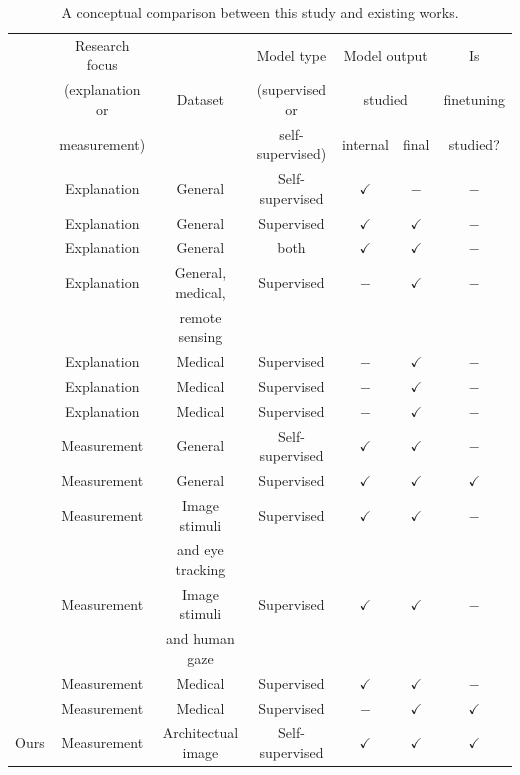 \documentclass[lineno,pdflatex,sn-mathphys-num]{sn-jnl}%
\theoremstyle{thmstyleone}%
\theoremstyle{thmstyletwo}%
\theoremstyle{thmstylethree}%
\begin{document}
\begin{table}[!h]
\caption{A conceptual comparison between this study and existing works. \label{table review}}
\begin{tabular}{ccccccc}
\hline
 & Research focus  &  & Model type & \multicolumn{2}{c}{Model output}  & Is \\
 & (explanation or & Dataset & (supervised or & \multicolumn{2}{c}{ studied}  & finetuning \\
 &  measurement) &  & self-supervised) & internal & final &  studied? \\ \hline\hline
\cite{Kang20259339} & Explanation & General & Self-supervised & $\checkmark$ & $-$ & $-$ \\
\cite{Jo2025582} & Explanation & General & Supervised & $\checkmark$ & $\checkmark$ & $-$ \\
\cite{Liao2025PR} & Explanation & General & both & $\checkmark$ & $\checkmark$ & $-$ \\
\cite{Hanna25ICCV} & Explanation & General, medical, & Supervised & $-$ & $\checkmark$ & $-$ \\
 &  & remote sensing &   &  &  & \\
\cite{Cascone25ICCV} & Explanation & Medical & Supervised & $-$ & $\checkmark$ & $-$ \\
\cite{Hasannezhad2025} & Explanation & Medical & Supervised & $-$ & $\checkmark$ & $-$ \\
\cite{Velvizhi2026} & Explanation & Medical & Supervised & $-$ & $\checkmark$ & $-$ \\ \hline
\cite{park2023what} & Measurement & General & Self-supervised & $\checkmark$ & $\checkmark$ & $-$ \\
\cite{Walmer23CVPR} & Measurement & General & Supervised & $\checkmark$ & $\checkmark$ & $\checkmark$ \\
\cite{Carrasco2026} & Measurement & Image stimuli & Supervised & $\checkmark$ & $\checkmark$ & $-$ \\
 &  & and eye tracking &   &  &  & \\
\cite{Yamamoto2025} & Measurement & Image stimuli & Supervised & $\checkmark$ & $\checkmark$ & $-$ \\
 &  & and human gaze &   &  &  & \\
\cite{Cascone2026947} & Measurement & Medical & Supervised & $\checkmark$ & $\checkmark$ & $-$ \\
\cite{Chung2025110} & Measurement & Medical & Supervised & $-$ & $\checkmark$ & $\checkmark$ \\ \hline
Ours & Measurement & Architectual image & Self-supervised & $\checkmark$ & $\checkmark$ & $\checkmark$ \\ \hline
\end{tabular}
\end{table}
\end{document}

